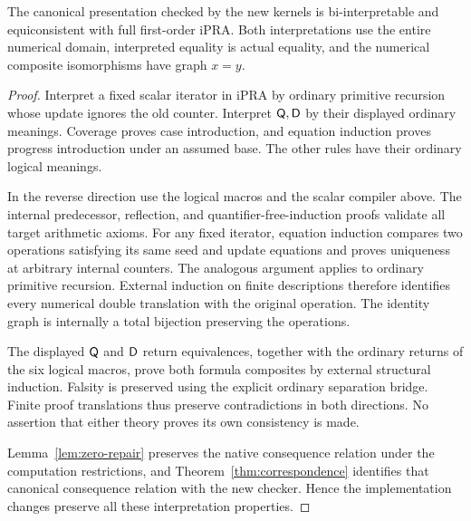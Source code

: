 \begin{theorem}
The canonical presentation checked by the new kernels is bi-interpretable
and equiconsistent with full first-order iPRA. Both interpretations use
the entire numerical domain, interpreted equality is actual equality,
and the numerical composite isomorphisms have graph $x=y$.
\end{theorem}
\begin{proof}
Interpret a fixed scalar iterator in iPRA by ordinary primitive recursion
whose update ignores the old counter. Interpret $\mathsf Q,\mathsf D$ by their displayed
ordinary meanings. Coverage proves case introduction, and equation
induction proves progress introduction under an assumed base. The other
rules have their ordinary logical meanings.

In the reverse direction use the logical macros and the scalar compiler
above. The internal predecessor, reflection, and quantifier-free-induction
proofs validate all target arithmetic axioms. For any fixed iterator,
equation induction compares two operations satisfying its same seed and
update equations and proves uniqueness at arbitrary internal counters.
The analogous argument applies to ordinary primitive recursion. External
induction on finite descriptions therefore identifies every numerical
double translation with the original operation. The identity graph is
internally a total bijection preserving the operations.

The displayed $\mathsf Q$ and $\mathsf D$ return equivalences, together with the ordinary
returns of the six logical macros, prove both formula composites by
external structural induction. Falsity is preserved using the explicit
ordinary separation bridge. Finite proof translations thus preserve
contradictions in both directions. No assertion that either theory proves
its own consistency is made.

Lemma~\ref{lem:zero-repair} preserves the native consequence relation
under the computation restrictions, and
Theorem~\ref{thm:correspondence} identifies that canonical consequence
relation with the new checker. Hence the implementation changes preserve
all these interpretation properties.
\end{proof}
